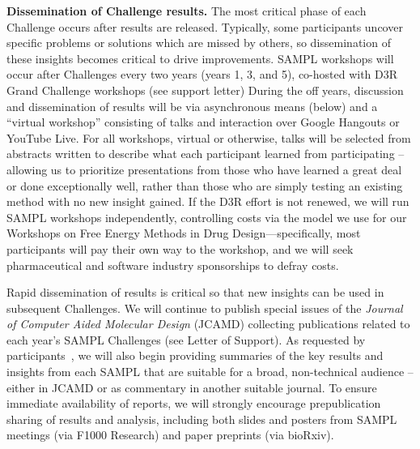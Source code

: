 \documentclass[11pt]{article}
\begin{document}
{\bf Dissemination of Challenge results.}
The most critical phase of each Challenge occurs after results are released. 
Typically, some participants uncover specific problems or solutions which are missed by others, so dissemination of these insights becomes critical to drive improvements.
SAMPL workshops will occur after Challenges every two years (years 1, 3, and 5), co-hosted with D3R Grand Challenge workshops (see support letter)
During the off years, discussion and dissemination of results will be via asynchronous means (below) and a ``virtual workshop'' consisting of talks and interaction over Google Hangouts or YouTube Live.
For all workshops, virtual or otherwise, talks will be selected from abstracts written to describe what each participant learned from participating -- allowing us to prioritize presentations from those who have learned a great deal or done exceptionally well, rather than those who are simply testing an existing method with no new insight gained. 
If the D3R effort is not renewed, we will run SAMPL workshops independently, controlling costs via the model we use for our Workshops on Free Energy Methods in Drug Design---specifically, most participants will pay their own way to the workshop, and we will seek pharmaceutical and software industry sponsorships to defray costs. 

Rapid dissemination of results is critical so that new insights can be used in subsequent Challenges.
We will continue to publish special issues of the \emph{Journal of Computer Aided Molecular Design} (JCAMD) collecting publications related to each year's SAMPL Challenges (see Letter of Support).
As requested by participants~\cite{Mobley:2017:eScholarship}, we will also begin providing summaries of the key results and insights from each SAMPL that are suitable for a broad, non-technical audience -- either in JCAMD or as commentary in another suitable journal.
To ensure immediate availability of reports, we will strongly encourage prepublication sharing of results and analysis, including both slides and posters from SAMPL meetings (via F1000 Research) and paper preprints (via bioRxiv).
\end{document}
